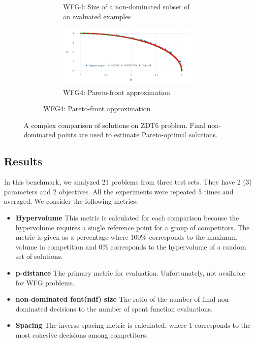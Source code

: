 \begin{figure}
\begin{subfigure}{\textwidth}
\begin{subfigure}{0.5\textwidth}
                \caption{WFG4: Size of a non-dominated subset of an evaluated examples}
                \label{fig:wfg4_ndf}
            \end{subfigure} 
            \begin{subfigure}{0.5\textwidth}
                \includegraphics[width=\textwidth]{content/images/wfg4_front}
                \caption{WFG4: Pareto-front approximation}
                \label{fig:wfg4_front}
            \end{subfigure}
        \end{subfigure} 
        \caption[Comparison of solutions on ZDT6 problem]{A complex comparison of solutions on ZDT6 problem. Final non-dominated points are used to estimate Pareto-optimal solutions.}
        \label{fig:wfg14}    
    \end{figure}

    \subsection*{Results}

    In this benchmark, we analyzed 21 problems from three test sets. They have 2 (3) parameters and 2 objectives. All the experiments were repeated 5 times and averaged. We consider the following metrics:
    \begin{itemize}
        \item \textbf{Hypervolume} This metric is calculated for each comparison because the hypervolume requires a single reference point for a group of competitors. The metric is given as a percentage where $100\%$ corresponds to the maximum volume in competition and $0\%$ corresponds to the hypervolume of a random set of solutions.
        \item \textbf{p-distance} The primary metric for evaluation. Unfortunately, not available for WFG problems.
        \item \textbf{non-dominated font(ndf) size} The ratio of the number of final non-dominated decisions to the number of spent function evaluations.
        \item \textbf{Spacing} The inverse spacing metric is calculated, where 1 corresponds to the most cohesive decisions among competitors.
    \end{itemize}


